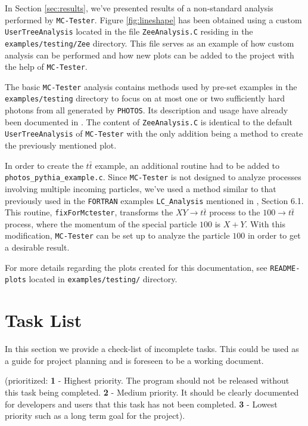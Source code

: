 \documentclass[]{Photos_interface_design}
\begin{document}
In Section \ref{sec:results}, we've presented results of a non-standard
analysis performed by {\tt MC-Tester}. Figure \ref{fig:lineshape} has been
obtained using a custom {\tt UserTreeAnalysis} located in the file {\tt ZeeAnalysis.C}
residing in the {\tt examples/testing/Zee} directory. This file serves as an
example of how custom analysis can be performed and how new plots can be
added to the project with the help of {\tt MC-Tester}.

The basic {\tt MC-Tester} analysis contains methods used by pre-set examples
in the {\tt examples/testing} directory to focus on at most one or two 
sufficiently hard photons from all generated
by {\tt PHOTOS}. Its description and usage have already been documented in \cite{Davidson:2008ma}.
The content of {\tt ZeeAnalysis.C} is identical to the default {\tt UserTreeAnalysis}
of {\tt MC-Tester} with the only addition being a method to create
the previously mentioned plot.

In order to create the $t \bar t$ example, an additional routine had to be added to {\tt photos\_pythia\_example.c}.
Since {\tt MC-Tester} is not designed to analyze processes involving
multiple incoming particles, we've used a method similar to that previously
used in the {\tt FORTRAN} examples {\tt LC\_Analysis} mentioned in \cite{Golonka:2002rz}, Section 6.1.
This routine, {\tt fixForMctester}, transforms the $X Y \rightarrow t \bar t$
process to the $100 \rightarrow t \bar t$ process,
where the momentum of the
special particle $100$ is $X + Y$. With this modification, {\tt MC-Tester} can be set
up to analyze the particle $100$ in order to get a desirable result.

For more details regarding the plots created for this documentation, see
{\tt README-plots} located in {\tt examples/testing/} directory.

\newpage

\section*{Task List}
In this section we provide a check-list of incomplete tasks.
This could be used as a guide for project planning and is foreseen
to be a working document. 

(prioritized: {\bf 1} - Highest priority. The program should not be
released without this task being completed. {\bf 2} - Medium priority.
It should be clearly documented for developers and users that this task has not
been completed. {\bf 3} - Lowest priority such as a long term goal 
for the project).
\end{document}
